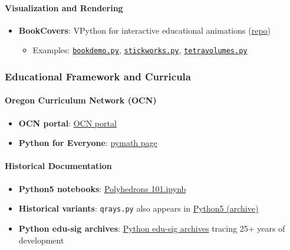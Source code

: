 \documentclass[
  10pt,
]{article}
\newcommand{\passthrough}[1]{#1}
\providecommand{\tightlist}{%
  \setlength{\itemsep}{0pt}\setlength{\parskip}{0pt}}
\begin{document}
\paragraph{Visualization and
Rendering}\label{visualization-and-rendering}

\begin{itemize}
\tightlist
\item
  \textbf{BookCovers}: VPython for interactive educational animations
  (\href{https://github.com/4dsolutions/BookCovers}{repo})

  \begin{itemize}
  \tightlist
  \item
    Examples:
    \href{https://github.com/4dsolutions/BookCovers/blob/master/bookdemo.py}{\passthrough{\lstinline!bookdemo.py!}},
    \href{https://github.com/4dsolutions/BookCovers/blob/master/stickworks.py}{\passthrough{\lstinline!stickworks.py!}},
    \href{https://github.com/4dsolutions/BookCovers/blob/master/tetravolumes.py}{\passthrough{\lstinline!tetravolumes.py!}}
  \end{itemize}
\end{itemize}

\subsubsection{Educational Framework and
Curricula}\label{educational-framework-and-curricula}

\paragraph{Oregon Curriculum Network
(OCN)}\label{oregon-curriculum-network-ocn}

\begin{itemize}
\tightlist
\item
  \textbf{OCN portal}: \href{http://www.4dsolutions.net/ocn/}{OCN
  portal}
\item
  \textbf{Python for Everyone}:
  \href{http://www.4dsolutions.net/ocn/pymath.html}{pymath page}
\end{itemize}

\paragraph{Historical Documentation}\label{historical-documentation}

\begin{itemize}
\tightlist
\item
  \textbf{Python5 notebooks}:
  \href{https://raw.githubusercontent.com/4dsolutions/Python5/master/Polyhedrons\%20101.ipynb}{Polyhedrons
  101.ipynb}
\item
  \textbf{Historical variants}: \passthrough{\lstinline!qrays.py!} also
  appears in
  \href{https://github.com/4dsolutions/Python5/blob/master/qrays.py}{Python5
  (archive)}
\item
  \textbf{Python edu-sig archives}:
  \href{https://mail.python.org/pipermail/edu-sig/2000-May/000498.html}{Python
  edu-sig archives} tracing 25+ years of development
\end{itemize}
\end{document}
